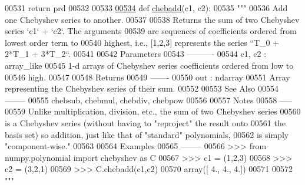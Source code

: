 \begin{DoxyCode}
00531         \textcolor{keywordflow}{return} prd
00532 
00533 
\hypertarget{chebyshev_8py_source_l00534}{}\hyperlink{namespacepyneb_1_1utils_1_1chebyshev_a06a85eb72ae35925336a6b550dec3f02}{00534} \textcolor{keyword}{def }\hyperlink{namespacepyneb_1_1utils_1_1chebyshev_a06a85eb72ae35925336a6b550dec3f02}{chebadd}(c1, c2):
00535     \textcolor{stringliteral}{"""}
00536 \textcolor{stringliteral}{    Add one Chebyshev series to another.}
00537 \textcolor{stringliteral}{}
00538 \textcolor{stringliteral}{    Returns the sum of two Chebyshev series `c1` + `c2`.  The arguments}
00539 \textcolor{stringliteral}{    are sequences of coefficients ordered from lowest order term to}
00540 \textcolor{stringliteral}{    highest, i.e., [1,2,3] represents the series ``T\_0 + 2*T\_1 + 3*T\_2``.}
00541 \textcolor{stringliteral}{}
00542 \textcolor{stringliteral}{    Parameters}
00543 \textcolor{stringliteral}{    ----------}
00544 \textcolor{stringliteral}{    c1, c2 : array\_like}
00545 \textcolor{stringliteral}{        1-d arrays of Chebyshev series coefficients ordered from low to}
00546 \textcolor{stringliteral}{        high.}
00547 \textcolor{stringliteral}{}
00548 \textcolor{stringliteral}{    Returns}
00549 \textcolor{stringliteral}{    -------}
00550 \textcolor{stringliteral}{    out : ndarray}
00551 \textcolor{stringliteral}{        Array representing the Chebyshev series of their sum.}
00552 \textcolor{stringliteral}{}
00553 \textcolor{stringliteral}{    See Also}
00554 \textcolor{stringliteral}{    --------}
00555 \textcolor{stringliteral}{    chebsub, chebmul, chebdiv, chebpow}
00556 \textcolor{stringliteral}{}
00557 \textcolor{stringliteral}{    Notes}
00558 \textcolor{stringliteral}{    -----}
00559 \textcolor{stringliteral}{    Unlike multiplication, division, etc., the sum of two Chebyshev series}
00560 \textcolor{stringliteral}{    is a Chebyshev series (without having to "reproject" the result onto}
00561 \textcolor{stringliteral}{    the basis set) so addition, just like that of "standard" polynomials,}
00562 \textcolor{stringliteral}{    is simply "component-wise."}
00563 \textcolor{stringliteral}{}
00564 \textcolor{stringliteral}{    Examples}
00565 \textcolor{stringliteral}{    --------}
00566 \textcolor{stringliteral}{    >>> from numpy.polynomial import chebyshev as C}
00567 \textcolor{stringliteral}{    >>> c1 = (1,2,3)}
00568 \textcolor{stringliteral}{    >>> c2 = (3,2,1)}
00569 \textcolor{stringliteral}{    >>> C.chebadd(c1,c2)}
00570 \textcolor{stringliteral}{    array([ 4.,  4.,  4.])}
00571 \textcolor{stringliteral}{}
00572 \textcolor{stringliteral}{    """}

\end{DoxyCode}
